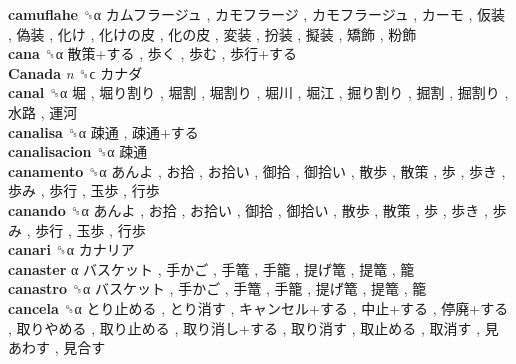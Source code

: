 \textbf{camuflahe} ␝α   カムフラージュ ,  カモフラージ ,  カモフラージュ ,  カーモ ,  仮装 ,  偽装 ,  化け ,  化けの皮 ,  化の皮 ,  変装 ,  扮装 ,  擬装 ,  矯飾 ,  粉飾   \\
\textbf{cana} ␝α   散策+する ,  歩く ,  歩む ,  歩行+する   \\
\textbf{Canada} \emph{n}  ␝ϲ   カナダ   \\
\textbf{canal} ␝α   堀 ,  堀り割り ,  堀割 ,  堀割り ,  堀川 ,  堀江 ,  掘り割り ,  掘割 ,  掘割り ,  水路 ,  運河   \\
\textbf{canalisa} ␝α   疎通 ,  疎通+する   \\
\textbf{canalisacion} ␝α   疎通   \\
\textbf{canamento} ␝α   あんよ ,  お拾 ,  お拾い ,  御拾 ,  御拾い ,  散歩 ,  散策 ,  歩 ,  歩き ,  歩み ,  歩行 ,  玉歩 ,  行歩   \\
\textbf{canando} ␝α   あんよ ,  お拾 ,  お拾い ,  御拾 ,  御拾い ,  散歩 ,  散策 ,  歩 ,  歩き ,  歩み ,  歩行 ,  玉歩 ,  行歩   \\
\textbf{canari} ␝α   カナリア   \\
\textbf{canaster} α   バスケット ,  手かご ,  手篭 ,  手籠 ,  提げ篭 ,  提篭 ,  籠   \\
\textbf{canastro} ␝α   バスケット ,  手かご ,  手篭 ,  手籠 ,  提げ篭 ,  提篭 ,  籠   \\
\textbf{cancela} ␝α   とり止める ,  とり消す ,  キャンセル+する ,  中止+する ,  停廃+する ,  取りやめる ,  取り止める ,  取り消し+する ,  取り消す ,  取止める ,  取消す ,  見あわす ,  見合す   \\
